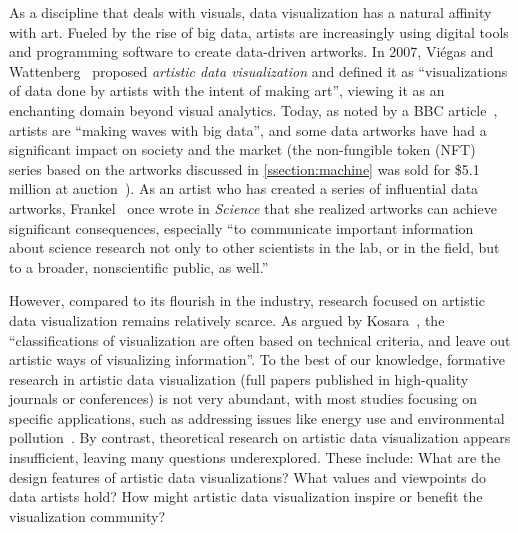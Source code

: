 
\maketitle


As a discipline that deals with visuals, data visualization has a natural affinity with art. Fueled by the rise of big data, artists are increasingly using digital tools and programming software to create data-driven artworks. In 2007, Viégas and Wattenberg~\cite{viegas2007artistic} proposed \textit{artistic data visualization} and defined it as ``visualizations of data done by artists with the intent of making art'', viewing it as an enchanting domain beyond visual analytics.
Today, as noted by a BBC article~\cite{bbc}, artists are ``making waves with big data'', and some data artworks have had a significant impact on society and the market (\eg the non-fungible token (NFT) series based on the artworks discussed in \autoref{ssection:machine} was sold for \$5.1 million at auction~\cite{yahoo}).
As an artist who has created a series of influential data artworks, Frankel~\cite{frankel1998envisioning} once wrote in \textit{Science} that she realized artworks can achieve significant consequences, especially ``to communicate important information about science research not only to other scientists in the lab, or in the field, but to a broader, nonscientific public, as well.'' 

However, compared to its flourish in the industry, research focused on artistic data visualization remains relatively scarce. As argued by Kosara~\cite{kosara2007visualization}, the ``classifications of visualization are often based on technical criteria, and leave out artistic ways of visualizing information''. 
To the best of our knowledge, formative research in artistic data visualization (\eg full papers published in high-quality journals or conferences) is not very abundant, with most studies focusing on specific applications, such as addressing issues like energy use and environmental pollution~\cite{rodgers2011exploring,schroeder2015visualization,perovich2020chemicals}. 
By contrast, theoretical research on artistic data visualization appears insufficient, leaving many questions underexplored. These include: What are the design features of artistic data visualizations? What values and viewpoints do data artists hold? How might artistic data visualization inspire or benefit the visualization community?

